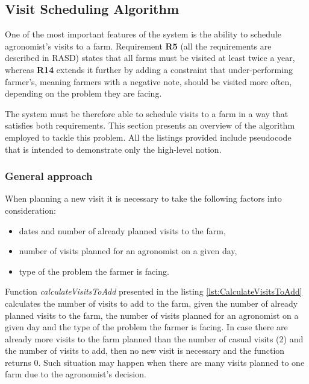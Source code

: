 \subsection{Visit Scheduling Algorithm}\label{subsec:visits-alg}

One of the most important features of the system is the ability to schedule agronomist's visits to a farm. Requirement \textbf{R5} (all the requirements are described in RASD) states that all farms must be visited at least twice a year, whereas \textbf{R14} extends it further by adding a constraint that under-performing farmer's, meaning farmers with a negative note, should be visited more often, depending on the problem they are facing.

The system must be therefore able to schedule visits to a farm in a way that satisfies both requirements. This section presents an overview of the algorithm employed to tackle this problem. All the listings provided include pseudocode that is intended to demonstrate only the high-level notion.

\subsubsection*{General approach}

When planning a new visit it is necessary to take the following factors into consideration:
\begin{itemize}
    \item dates and number of already planned visits to the farm,
    \item number of visits planned for an agronomist on a given day,
    \item type of the problem the farmer is facing.
\end{itemize}

Function \textit{calculateVisitsToAdd} presented in the listing \ref{lst:CalculateVisitsToAdd} calculates the number of visits to add to the farm, given the number of already planned visits to the farm, the number of visits planned for an agronomist on a given day and the type of the problem the farmer is facing. In case there are already more visits to the farm planned than the number of casual visits (2) and the number of visits to add, then no new visit is necessary and the function returns 0. Such situation may happen when there are many visits planned to one farm due to the agronomist's decision.



